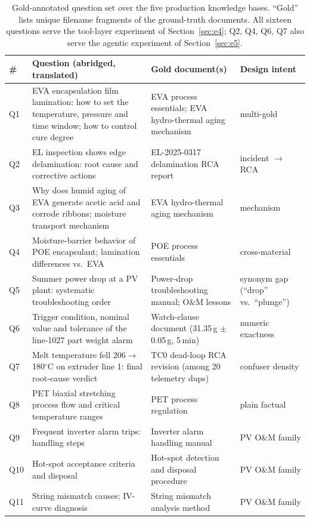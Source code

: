 \begin{table}[!htbp]
\centering
\scriptsize
\setlength{\tabcolsep}{3pt}
\caption{Gold-annotated question set over the five production knowledge
bases. ``Gold'' lists unique filename fragments of the ground-truth
documents. All sixteen questions serve the tool-layer experiment of
Section~\ref{sec:e4}; Q2, Q4, Q6, Q7 also
serve the agentic experiment of Section~\ref{sec:e5}.}
\label{tab:questions}
\begin{tabular}{lp{5.3cm}p{4.0cm}p{2.8cm}}
\toprule
\# & Question (abridged, translated) & Gold document(s) & Design intent \\
\midrule
Q1 & EVA encapsulation film lamination: how to set the temperature, pressure
and time window; how to control cure degree & EVA process essentials; EVA
hydro-thermal aging mechanism & multi-gold \\
Q2 & EL inspection shows edge delamination: root cause and corrective
actions & EL-2025-0317 delamination RCA report & incident $\to$ RCA \\
Q3 & Why does humid aging of EVA generate acetic acid and corrode ribbons;
moisture transport mechanism & EVA hydro-thermal aging mechanism & mechanism \\
Q4 & Moisture-barrier behavior of POE encapsulant; lamination differences
vs.\ EVA & POE process essentials & cross-material \\
Q5 & Summer power drop at a PV plant: systematic troubleshooting order &
Power-drop troubleshooting manual; O\&M lessons & synonym gap
(``drop'' vs.\ ``plunge'') \\
Q6 & Trigger condition, nominal value and tolerance of the line-1027 part
weight alarm & Watch-clause document (31.35\,g $\pm$0.05\,g, 5\,min) &
numeric exactness \\
Q7 & Melt temperature fell 206$\to$180$^\circ$C on extruder line 1: final
root-cause verdict & TC0 dead-loop RCA revision (among 20 telemetry dups) &
confuser density \\
Q8 & PET biaxial stretching process flow and critical temperature ranges &
PET process regulation & plain factual \\
Q9 & Frequent inverter alarm trips: handling steps & Inverter alarm handling
manual & PV O\&M family \\
Q10 & Hot-spot acceptance criteria and disposal & Hot-spot detection and
disposal procedure & PV O\&M family \\
Q11 & String mismatch causes; IV-curve diagnosis & String mismatch analysis
method & PV O\&M family \\

\end{tabular}
\end{table}
